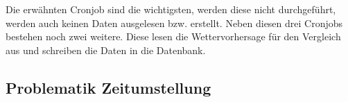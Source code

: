 Die erwähnten Cronjob sind die wichtigsten, werden diese nicht durchgeführt, werden auch keinen Daten ausgelesen bzw. erstellt. Neben diesen drei Cronjobs bestehen noch zwei weitere. Diese lesen die Wettervorhersage für den Vergleich aus und schreiben die Daten in die Datenbank. 

\subsection{Problematik Zeitumstellung}



